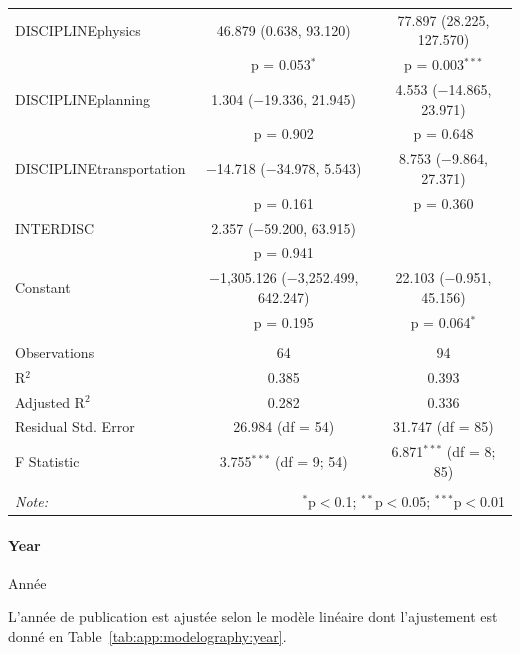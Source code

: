 \begin{table}
\begin{tabular}{@{\extracolsep{5pt}}lcc}
  DISCIPLINEphysics & 46.879 (0.638, 93.120) & 77.897 (28.225, 127.570) \\ 
  & p = 0.053$^{*}$ & p = 0.003$^{***}$ \\ 
  DISCIPLINEplanning & 1.304 ($-$19.336, 21.945) & 4.553 ($-$14.865, 23.971) \\ 
  & p = 0.902 & p = 0.648 \\ 
  DISCIPLINEtransportation & $-$14.718 ($-$34.978, 5.543) & 8.753 ($-$9.864, 27.371) \\ 
  & p = 0.161 & p = 0.360 \\ 
  INTERDISC & 2.357 ($-$59.200, 63.915) &  \\ 
  & p = 0.941 &  \\ 
  Constant & $-$1,305.126 ($-$3,252.499, 642.247) & 22.103 ($-$0.951, 45.156) \\ 
  & p = 0.195 & p = 0.064$^{*}$ \\ 
 \hline \\[-1.8ex] 
Observations & 64 & 94 \\ 
R$^{2}$ & 0.385 & 0.393 \\ 
Adjusted R$^{2}$ & 0.282 & 0.336 \\ 
Residual Std. Error & 26.984 (df = 54) & 31.747 (df = 85) \\ 
F Statistic & 3.755$^{***}$ (df = 9; 54) & 6.871$^{***}$ (df = 8; 85) \\ 
\hline 
\hline \\[-1.8ex] 
\textit{Note:}  & \multicolumn{2}{r}{$^{*}$p$<$0.1; $^{**}$p$<$0.05; $^{***}$p$<$0.01} \\ 
\end{tabular} 
\end{table} 



\paragraph{Year}{Année}

L'année de publication est ajustée selon le modèle linéaire dont l'ajustement est donné en Table~\ref{tab:app:modelography:year}.

